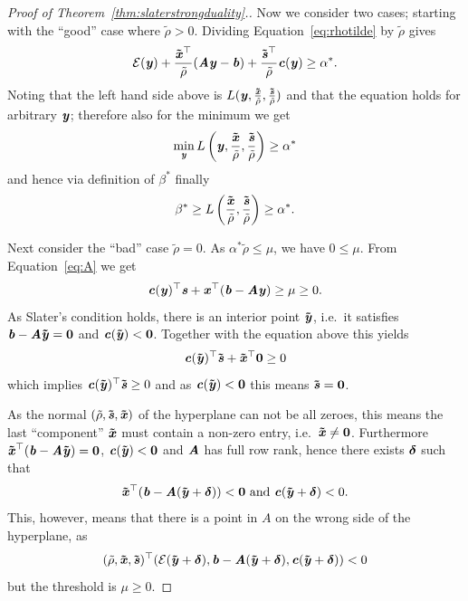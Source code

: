 \begin{proof}[Proof of Theorem~\ref{thm:slaterstrongduality}.]
Now we consider two cases; starting with the ``good'' case where $\tilde\rho > 0$.
Dividing  Equation~\eqref{eq:rhotilde} by $\tilde\rho$ gives
\begin{equation*}
  \energy(\yy) + \frac{\xxtil^{\trp}}{\tilde\rho}(\AA\yy - \bb) + \frac{\sstil^{\trp}}{\tilde\rho}\cc(\yy) \geq \alpha^*.
\end{equation*}
Noting that the left hand side above is $L(\yy, \frac{\xxtil}{\tilde\rho}, \frac{\sstil}{\tilde\rho})$
and that the equation holds for arbitrary $\yy$; therefore also for the minimum we get
\begin{equation*} \min_{\yy}{L\left(\yy, \frac{\xxtil}{\tilde\rho}, \frac{\sstil}{\tilde\rho}\right)}\geq \alpha^* \end{equation*}
and hence via definition of $\beta^*$ finally
\begin{equation*} \beta^* \geq L\left(\frac{\xxtil}{\tilde\rho},\frac{\sstil}{\tilde\rho}\right) \geq \alpha^*. \end{equation*}

Next consider the ``bad'' case $\tilde\rho = 0$.
As $\alpha^*\tilde\rho \leq \mu$, we have $0 \leq \mu$.
From  Equation~\eqref{eq:A} we get
\begin{equation*}
  \cc(\yy)^{\trp}\ss + \xx^{\trp}(\bb-\AA\yy) \geq \mu \geq 0.
\end{equation*}
As Slater's condition holds, there is an interior point $\yytil$, i.e.\ it satisfies $\bb - \AA\yytil = \veczero$ and $\cc(\yytil) < \veczero$. Together with the equation above this yields
\begin{equation*} \cc(\yytil)^{\trp}\sstil + \xxtil^{\trp}\veczero \geq 0 \end{equation*}
which implies
$\cc(\yytil)^{\trp}\sstil \geq 0 $
and as $\cc(\yytil) < \veczero$ this means $\sstil = \veczero$.

As the normal $(\tilde\rho,\sstil,\xxtil)$ of the hyperplane can not be all zeroes, this means the last ``component'' $\xxtil$ must contain a non-zero entry, i.e.\ $\xxtil \neq \veczero$.
Furthermore $\xxtil^{\trp}(\bb - \AA\yytil) = \veczero$, $\cc(\yytil) < \veczero$ and $\AA$ has full row rank, hence there exists $\ddelta$ such that
\begin{equation*}
\xxtil^{\trp}(\bb-\AA(\yytil+\ddelta)) < \veczero \text{ and } \cc(\yytil + \ddelta) < 0.
\end{equation*}
This, however, means that there is a point in $A$ on the wrong side of the hyperplane, as
\begin{equation*}
(\tilde\rho, \xxtil, \sstil)^{\trp}(\energy(\yytil+\ddelta), \bb-\AA(\yytil+\ddelta), \cc(\yytil+\ddelta)) < 0
\end{equation*}
but the threshold is $\mu \geq 0$.
\end{proof}

